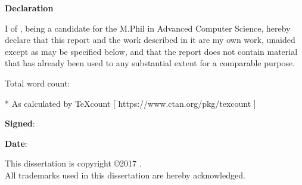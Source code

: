 \newpage
{\Huge \bf Declaration}

\vspace{24pt} 

I \authorname of \authorcollege, being a candidate for the M.Phil in
Advanced Computer Science, hereby declare that this report and the
work described in it are my own work, unaided except as may be
specified below, and that the report does not contain material that
has already been used to any substantial extent for a comparable
purpose.

\vspace{24pt}
Total word count: \wordcount*

* As calculated by TeXcount [ https://www.ctan.org/pkg/texcount ]

\vspace{60pt}
\textbf{Signed}: 

\vspace{12pt}
\textbf{Date}:


\vfill

This dissertation is copyright \copyright 2017 \authorname. 
\\
All trademarks used in this dissertation are hereby acknowledged.



\newpage
\vspace*{\fill}
